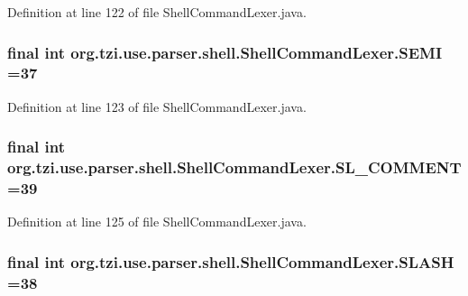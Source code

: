 Definition at line 122 of file Shell\-Command\-Lexer.\-java.

\hypertarget{classorg_1_1tzi_1_1use_1_1parser_1_1shell_1_1_shell_command_lexer_a2c5b70271bfd1043b835c92bf955006c}{
\subsubsection[{S\-E\-M\-I}]{\setlength{\rightskip}{0pt plus 5cm}final int org.\-tzi.\-use.\-parser.\-shell.\-Shell\-Command\-Lexer.\-S\-E\-M\-I =37\hspace{0.3cm}{\ttfamily [static]}}}\label{classorg_1_1tzi_1_1use_1_1parser_1_1shell_1_1_shell_command_lexer_a2c5b70271bfd1043b835c92bf955006c}


Definition at line 123 of file Shell\-Command\-Lexer.\-java.

\hypertarget{classorg_1_1tzi_1_1use_1_1parser_1_1shell_1_1_shell_command_lexer_a80803bfa7f019e74151fc6ebbe24460d}{
\subsubsection[{S\-L\-\_\-\-C\-O\-M\-M\-E\-N\-T}]{\setlength{\rightskip}{0pt plus 5cm}final int org.\-tzi.\-use.\-parser.\-shell.\-Shell\-Command\-Lexer.\-S\-L\-\_\-\-C\-O\-M\-M\-E\-N\-T =39\hspace{0.3cm}{\ttfamily [static]}}}\label{classorg_1_1tzi_1_1use_1_1parser_1_1shell_1_1_shell_command_lexer_a80803bfa7f019e74151fc6ebbe24460d}


Definition at line 125 of file Shell\-Command\-Lexer.\-java.

\hypertarget{classorg_1_1tzi_1_1use_1_1parser_1_1shell_1_1_shell_command_lexer_a97c15efa612250b69e05cb582b99dee2}{
\subsubsection[{S\-L\-A\-S\-H}]{\setlength{\rightskip}{0pt plus 5cm}final int org.\-tzi.\-use.\-parser.\-shell.\-Shell\-Command\-Lexer.\-S\-L\-A\-S\-H =38\hspace{0.3cm}{\ttfamily [static]}}}\label{classorg_1_1tzi_1_1use_1_1parser_1_1shell_1_1_shell_command_lexer_a97c15efa612250b69e05cb582b99dee2}


